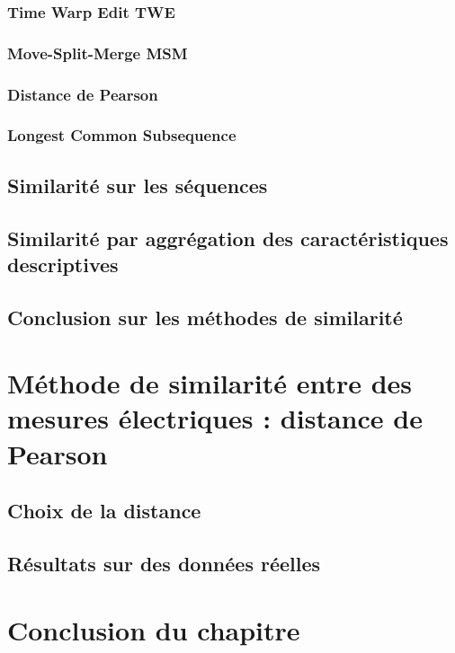 \documentclass[onecolumn, 12pt]{book}
\begin{document}
	\subsubsection{Time Warp Edit TWE}
		
	\subsubsection{Move-Split-Merge MSM}
		
	\subsubsection{Distance de Pearson}
		
	\subsubsection{Longest Common Subsequence}
		
%		
%		
	
\subsection{Similarit\'e sur les s\'equences}
	
\subsection{Similarit\'e par aggr\'egation des caract\'eristiques descriptives}
	
\subsection{Conclusion sur les m\'ethodes de similarit\'e}
	

\section{M\'ethode de similarit\'e entre des mesures \'electriques : distance de Pearson}
	\subsection{Choix de la distance}
		
%		
	\subsection{R\'esultats sur des donn\'ees r\'eelles}
		
\section{Conclusion du chapitre}
			
\end{document}
